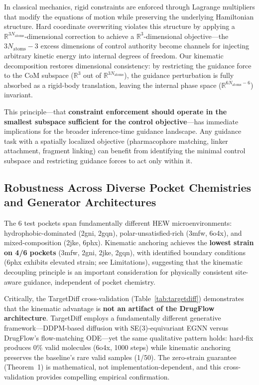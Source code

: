 \documentclass{article}
\newcommand{\reals}{\ensuremath{\mathbb{R}}}
\begin{document}
In classical mechanics, rigid constraints are enforced through Lagrange
multipliers that modify the equations of motion while preserving the
underlying Hamiltonian structure.  Hard coordinate overwriting violates
this structure by applying a $\reals^{3N_{\text{atoms}}}$-dimensional
correction to achieve a $\reals^3$-dimensional objective---the
$3N_{\text{atoms}} - 3$ excess dimensions of control authority become
channels for injecting arbitrary kinetic energy into internal degrees
of freedom.  Our kinematic decomposition restores dimensional consistency:
by restricting the guidance force to the CoM subspace ($\reals^3$ out of
$\reals^{3N_{\text{atoms}}}$), the guidance perturbation is fully absorbed
as a rigid-body translation, leaving the internal phase space
($\reals^{6N_{\text{atoms}}-6}$) invariant.

This principle---that \textbf{constraint enforcement should operate in the
smallest subspace sufficient for the control objective}---has immediate
implications for the broader inference-time guidance landscape.  Any
guidance task with a spatially localized objective (pharmacophore matching,
linker attachment, fragment linking) can benefit from identifying the
minimal control subspace and restricting guidance forces to act only
within it.

\subsection{Robustness Across Diverse Pocket Chemistries and Generator Architectures}

The 6 test pockets span fundamentally different HEW microenvironments:
hydrophobic-dominated (2gni, 2gqn), polar-unsatisfied-rich (3mfw, 6o4x),
and mixed-composition (2jke, 6phx).  Kinematic anchoring achieves the
\textbf{lowest strain on 4/6 pockets} (3mfw, 2gni, 2jke, 2gqn), with
identified boundary conditions (6phx exhibits elevated strain; see
Limitations), suggesting
that the kinematic decoupling principle is an important consideration for physically
consistent site-aware guidance, independent of pocket chemistry.

Critically, the TargetDiff cross-validation (Table~\ref{tab:targetdiff})
demonstrates that the kinematic advantage is \textbf{not an artifact of the
DrugFlow architecture}.  TargetDiff employs a fundamentally different
generative framework---DDPM-based diffusion with SE(3)-equivariant EGNN
\cite{guan2023targetdiff} versus DrugFlow's flow-matching ODE---yet the
same qualitative pattern holds: hard-fix produces 0\% valid molecules
(6o4x, 1000 steps) while kinematic anchoring preserves the baseline's rare
valid samples (1/50).
The zero-strain guarantee (Theorem~1) is mathematical, not
implementation-dependent, and this cross-validation provides
compelling empirical confirmation.
\end{document}
